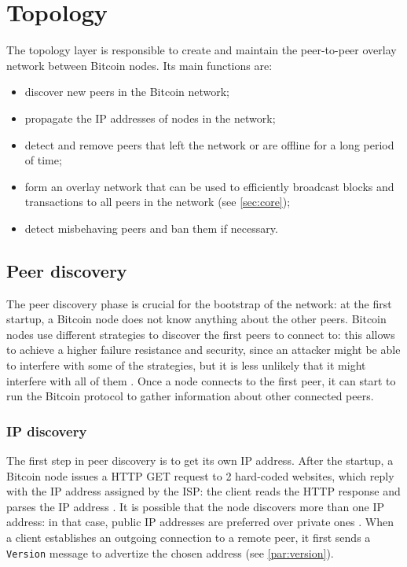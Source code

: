 \section{Topology}
\label{sec:topology}
The topology layer is responsible to create and maintain the peer-to-peer overlay network between Bitcoin nodes.
Its main functions are:
\begin{itemize}
	\item discover new peers in the Bitcoin network;
	\item propagate the IP addresses of nodes in the network;
	\item detect and remove peers that left the network or are offline for a long period of time;
	\item form an overlay network that can be used to efficiently broadcast blocks and transactions to all peers in the network (see \cref{sec:core});
	\item detect misbehaving peers and ban them if necessary.
\end{itemize}

\subsection{Peer discovery}
\label{sub:discovery}
The peer discovery phase is crucial for the bootstrap of the network:
at the first startup, a Bitcoin node does not know anything about the other peers.
Bitcoin nodes use different strategies to discover the first peers to connect to:
this allows to achieve a higher failure resistance and security, since an attacker might be able to interfere with some of the strategies, but it is less unlikely that it might interfere with all of them \cite{bitcoin_peer_discovery}.
Once a node connects to the first peer, it can start to run the Bitcoin protocol to gather information about other connected peers.

\subsubsection{IP discovery}
The first step in peer discovery is to get its own IP address.
After the startup, a Bitcoin node issues a HTTP GET request to \num{2} hard-coded websites, which reply with the IP address assigned by the \ac{ISP}:
the client reads the HTTP response and parses the IP address \cite{bitcoin_peer_discovery}.
It is possible that the node discovers more than one IP address:
in that case, public IP addresses are preferred over private ones \cite{deanonymisation_2014}.
When a client establishes an outgoing connection to a remote peer, it first sends a \texttt{Version} message to advertize the chosen address (see \cref{par:version}).

